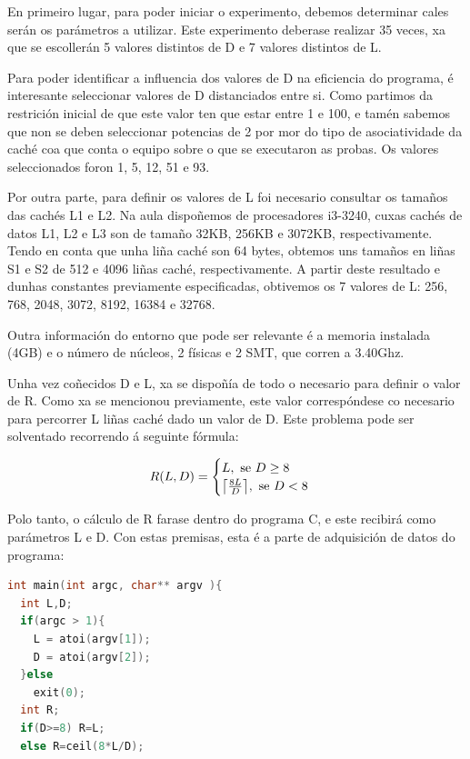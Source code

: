 \documentclass[letterpaper, 10 pt,spanish, conference]{ieeeconf}  %
\DeclarePairedDelimiter{\ceil}{\lceil}{\rceil}
\begin{document}
    En primeiro lugar, para poder iniciar o experimento,
    debemos determinar cales serán os parámetros a utilizar. Este experimento deberase realizar 35 veces, xa que se escollerán 5 valores distintos de D e 7 valores distintos de L. 
    
    Para poder identificar a influencia dos valores de D na eficiencia do programa, é interesante seleccionar valores de D distanciados entre si. Como partimos da restrición inicial de que este valor ten que estar entre 1 e 100, e tamén sabemos que non se deben seleccionar potencias de 2 por mor do tipo de asociatividade da caché coa que conta o equipo sobre o que se executaron as probas. Os valores seleccionados foron 1, 5, 12, 51 e 93.
    
    Por outra parte, para definir os valores de L foi necesario consultar os tamaños das cachés L1 e L2. Na aula dispoñemos de procesadores i3-3240\cite{c1}, cuxas cachés de datos L1, L2 e L3 son de tamaño 32KB, 256KB e 3072KB, respectivamente. Tendo en conta que unha liña caché son 64 bytes, obtemos uns tamaños en liñas S1 e S2 de 512 e 4096 liñas caché, respectivamente. A partir deste resultado e dunhas constantes previamente especificadas, obtivemos os 7 valores de L: 256, 768, 2048, 3072, 8192, 16384 e 32768.
    
    Outra información do entorno que pode ser relevante é a memoria instalada (4GB) e o número de núcleos, 2 físicas e 2 SMT, que corren a 3.40Ghz.
    
    Unha vez coñecidos D e L, xa se dispoñía de todo o necesario para definir o valor de R. Como xa se mencionou previamente, este valor correspóndese co necesario para percorrer L liñas caché dado un valor de D. Este problema pode ser solventado recorrendo á seguinte fórmula:
    
    \[ R(L,D)=\begin{cases}
	 L,  \text{ se } D\geq8\\ 
	 \ceil[\big]{\frac{8L}{D}},  \text{ se } D<8 
	\end{cases}\]
    
    Polo tanto, o cálculo de R farase dentro do programa C, e este recibirá como parámetros L e D. Con estas premisas, esta é a parte de adquisición de datos do programa:
    
\begin{lstlisting}[language=C++, caption=Adquisición de datos]
int main(int argc, char** argv ){
  int L,D;
  if(argc > 1){
    L = atoi(argv[1]);
    D = atoi(argv[2]);
  }else
    exit(0);
  int R;
  if(D>=8) R=L;
  else R=ceil(8*L/D);
\end{lstlisting}
\end{document}
